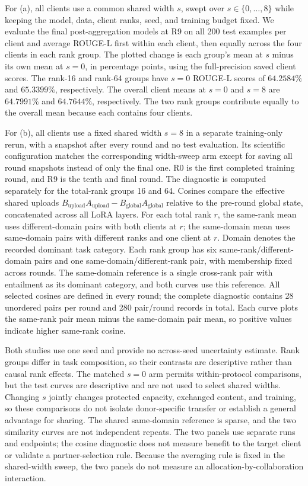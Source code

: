 For (a), all clients use a common shared width $s$, swept over $s\in\{0,\ldots,8\}$ while keeping the model, data, client ranks, seed, and training budget fixed.
We evaluate the final post-aggregation models at R9 on all 200 test examples per client and average ROUGE-L first within each client, then equally across the four clients in each rank group.
The plotted change is each group's mean at $s$ minus its own mean at $s=0$, in percentage points, using the full-precision saved client scores.
The rank-16 and rank-64 groups have $s=0$ ROUGE-L scores of $64.2584\%$ and $65.3399\%$, respectively.
The overall client means at $s=0$ and $s=8$ are $64.7991\%$ and $64.7644\%$, respectively.
The two rank groups contribute equally to the overall mean because each contains four clients.

For (b), all clients use a fixed shared width $s=8$ in a separate training-only rerun, with a snapshot after every round and no test evaluation.
Its scientific configuration matches the corresponding width-sweep arm except for saving all round snapshots instead of only the final one.
R0 is the first completed training round, and R9 is the tenth and final round.
The diagnostic is computed separately for the total-rank groups 16 and 64.
Cosines compare the effective shared uploads $B_{\mathrm{upload}}A_{\mathrm{upload}}-B_{\mathrm{global}}A_{\mathrm{global}}$ relative to the pre-round global state, concatenated across all LoRA layers.
For each total rank $r$, the same-rank mean uses different-domain pairs with both clients at $r$; the same-domain mean uses same-domain pairs with different ranks and one client at $r$.
Domain denotes the recorded dominant task category.
Each rank group has six same-rank/different-domain pairs and one same-domain/different-rank pair, with membership fixed across rounds.
The same-domain reference is a single cross-rank pair with entailment as its dominant category, and both curves use this reference.
All selected cosines are defined in every round; the complete diagnostic contains 28 unordered pairs per round and 280 pair/round records in total.
Each curve plots the same-rank pair mean minus the same-domain pair mean, so positive values indicate higher same-rank cosine.

Both studies use one seed and provide no across-seed uncertainty estimate.
Rank groups differ in task composition, so their contrasts are descriptive rather than causal rank effects.
The matched $s=0$ arm permits within-protocol comparisons, but the test curves are descriptive and are not used to select shared widths.
Changing $s$ jointly changes protected capacity, exchanged content, and training, so these comparisons do not isolate donor-specific transfer or establish a general advantage for sharing.
The shared same-domain reference is sparse, and the two similarity curves are not independent repeats.
The two panels use separate runs and endpoints; the cosine diagnostic does not measure benefit to the target client or validate a partner-selection rule.
Because the averaging rule is fixed in the shared-width sweep, the two panels do not measure an allocation-by-collaboration interaction.

